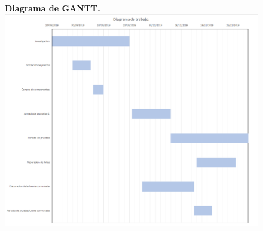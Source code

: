 \documentclass[letterpaper]{article}
\begin{document}
   
   \begin{LARGE}
   \begin{figure}[htbp]
        \textbf{Diagrama de GANTT.}\\
       \includegraphics[scale=0.5]{Img/gantt2.png}
 \end{figure}
   \end{LARGE}
   \newpage
\end{document}
